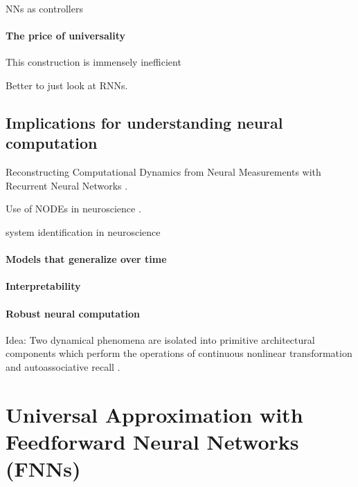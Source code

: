 \documentclass{article}
\theoremstyle{definition}
\theoremstyle{remark}
\newcounter{ct}
\begin{document}
NNs as controllers \citep{sontag1992neural}


\paragraph{The price of universality}
This construction is immensely inefficient

Better to just look at RNNs. 


\subsection{Implications for understanding neural computation} 

Reconstructing Computational Dynamics from Neural Measurements with Recurrent Neural Networks \citep{durstewitz2023reconstructing}.

Use of NODEs in neuroscience \citep{kim2021inferring}.

system identification in neuroscience \citep{han2023si} 

\paragraph{Models that generalize over time}


\paragraph{Interpretability}%


\paragraph{Robust neural computation}
Idea: Two dynamical phenomena are isolated into primitive architectural components which perform the operations of continuous nonlinear transformation and autoassociative recall \citep{pineda1988dynamics}.




\newpage





\newpage
\appendix 

\section{Universal Approximation with Feedforward Neural Networks (FNNs)}\label{sec:uniapproxffn}
\end{document}
